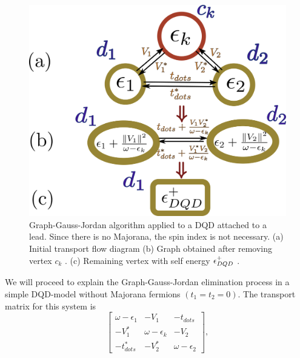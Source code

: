 \documentclass[showpacs,aps,prb,reprint,superscriptaddress]{revtex4-1}
\begin{document}
        \begin{figure}[t]
        \begin{center}
        \includegraphics[scale=0.25]{Graficos/Graph_DQD-Pro.png}
        \caption{ Graph-Gauss-Jordan  algorithm applied  to  a DQD attached to a lead. Since there is no Majorana, the spin index is not necessary.  (a) Initial transport flow diagram  (b) Graph obtained after removing vertex $c_k$ .  (c) Remaining vertex with self energy $\epsilon^+_{DQD}$ .
        }
        \label{fig:GraphsDQD}
        \end{center}
        \end{figure}




We will proceed to explain the  Graph-Gauss-Jordan \cite{spielman_algorithms_2010} elimination  process  in a simple DQD-model without Majorana fermions $(t_1= t_2=0)$.  The transport matrix for this system is 
\begin{equation}
        \left[\begin{array}{ccc}
    \omega-\epsilon_{1} & -V_{1} & -t_{dots}\\
    -V_{1}^{*} & \omega-\epsilon_{k} & -V_{2}\\
    -t_{dots}^{*} & -V_{2}^{*} & \omega-\epsilon_{2}
    \end{array}\right], \label{eq:DQDMatrix}
\end{equation}
\end{document}
